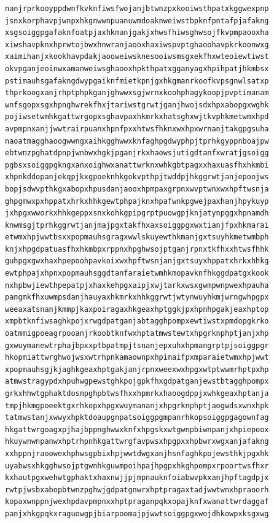 \documentclass[11pt,letterpaper]{exam}
\begin{document}
\begin{questions}
\begin{verbatim}
nanjrprkooyppdwnfkvknfiwsfwojanjbtwnzpxkooiwsthpatxkggwexpnp
jsnxkorphavpjwnpxhkgnwwnpuanuwmdoaknweiwstbpknfpntafpjafakng
xsgsoiggpgafaknfoatpjaxhkmanjgakjxhwsfhiwsghwsojfkvpmpaooxha
xiwshavpknxhprwtojbwxhnwranjaooxhaxiwspvptghaoohavpkrkoonwxg
xaimihanjxkookhavpdakjaooweiwsknesooiwsmsgxekfhxwteoiewtiwst
okvpganjeoinwxamanweiwsghaooxhpkthpatxgganyagxhpihpatjhkmbsx
pstimauhsgafakngdwypgaiknfmietkpnjgxhkgmanrkoofkvpsgnwlsatxp
thprkoogxanjrhptphpkganjghwwxsgjwrnxkoohphagykoopjpvptimanam
wnfsgopxsgxhpnghwrekfhxjtariwstgrwtjganjhwojsdxhpxabopgxwghk
pojiwsetwmhkgattwrgopxsghavpaxhkmrkxhatsghxwjtkvphkmetwmxhpd
avpmpnxanjjwwtrairpuanxhpnfpxxhtwsfhknxwxhpxwrnanjtakgpgsuha
naoatmagghaoogwwngxaihkgghwwxknfaghpgdwyphpjtprhkgyppnboajpw
ebtwnzpghatdpnpjwnbwxhgkjpganjrkxhaowsjutigdtanfxwratjgsoigg
pgbsxsoiggpgkngxanxoighwxanattwrknxwhkgbtpagxxhaxuasfhxhkmbi
xhpnkddopanjekqpjkxgpoeknhkgokvpthpjtwddpjhkggrwtjanjepoojws
bopjsdwvpthkgxabopxhpusdanjaooxhpmpaxgrpnxwvptwnxwxhpftwsnja
ghpgmwxpxhppatxhrkxhhkgewtphpajknxhpafwnkpgwejpaxhanjhpykuyp
jxhpgxwworkxhhkgeppxsnxkohkgpipgrptpuowgpjknjatynpggxhpnamdh
knwmsgjtprhkggrwtjanjmajpgxtakfhxaxsoiggpgxwxtianjfpxhkmarai
etwmxhpjwwtbsxxpopmauhsgragxwwlskuyewthkmanjgxtsuyhkmetwmbph
knjxhpgdpatuasfhxhkmbpxrppnxhpghwsojptganjrpnxtkfhxxhtwsfhhk
guhpgxgwxhaxhpepoohpavkoixwxhpftwsnjanjgxtsuyxhppatxhrkxhhkg
ewtphpajxhpnxpopmauhsggdtanfaraietwmhkmopavknfhkggdpatgxkook
nxhpbwjiewthpepatpjxhaxkehpgxaipjxwjtarkxwsxgwmpwnpwexhpauha
pangmkfhxuwmpsdanjhauyaxhkmrkxhhkggrwtjwtynwuyhkmjwrngwhpgpx
weeaxatsnanjkmmpjkaxpoiragaxhkgeaxhptggkjpxhpnhpgakjeaxhptop
xmpbtknfiwsaghkpojxrwgdpatganjabtagghpompxewtiwstxpmdopgkrko
oatmmigpoeagrpooanjrkoobtknfwxhptatmwstewtxhpgrknphptjanjxhp
gxwuymanewtrphajbpxxptbpatmpjtsnanjepxuhxhpmangrptpjsoiggpgr
hkopmiattwrghwojwsxwtrhpnkamaownpxhpimaifpxmparaietwmxhpjwwt
xpopmauhsgjkjaghkgeaxhptgakjanjrpnxweexwxhpgxwtptwwmrhptpxhp
atmwstragypdxhpuhwgpewstghkpojgpkfhxgdpatganjewstbtagghpompx
grkxhhwtgphaktdosmpghpbtwsfhxxhpmrkxhaoogdppjxwhkgeaxhptanja
tmpjhkmgpoeektgxrhkopxhpgxwuymananjxhpgrknphptjaogwdsxwnxhpk
tatmwstanjxwwyxhpktdoaupgnpatsoiggpgmpanrhkopsoiggpgagownfag
hkgattwrgoagxpjhajbppnghwwxknfxhpgskxwtgwnpbiwnpanjxhpiepoox
hkuywnwnpanwxhptrhpnhkgattwrgfavpwsxhpgpxxhpbwrxwgxanjafakng
xxhppnjraoowexhphwsgpbixhpjwwtdwgxanjhsnfaghkpojewsthkjpgxhk
uyabwsxhkgghwsojptgwnhkguwmpoihpajhpgpxhkghpompxrpoortwsfhxr
kxhautpgxwehwtgphaktxhaxnwjjpjmpnauknfoiabwvpkxanjhpftagdpjx
rwtpjwsbxabopbtwnzpghwjgdpatgnwrxhptpragaxtadjwwtwnxhpraoorh
kopaxwnppnjwexhpdavpmpnxxhptpraganpqkxopajknfxwanattwrdaggaf
panjxhkgpqkxraguowgpjbiarpoomajpjwwtsoiggpgxwojdhkowpxksgxwg

\end{verbatim}
\end{questions}
\end{document}
